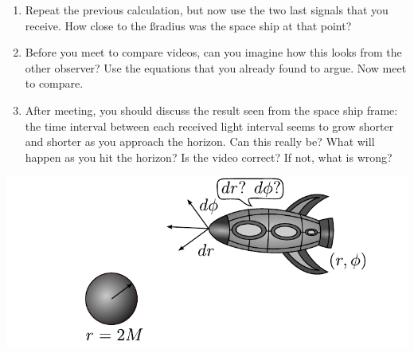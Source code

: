 {\begin{multicols}{2}
\begin{enumerate}
\item Repeat the previous calculation, but now use the two last signals that you receive. How close to the \ss radius was the space ship at that point?
\item Before you meet to compare videos, can you imagine how this looks from the other observer? Use the equations that you already found to argue. Now meet to compare.
\item After meeting, you should discuss the result seen from the space ship frame: the time interval between each received light interval seems to grow shorter and shorter as you approach the horizon. Can this really be? What will happen as you hit the horizon? Is the video correct? If not, what is wrong?
\end{enumerate}






\begin{Figure}
\centering
\includegraphics[width=\textwidth]{fig_17-1.pdf}
\end{Figure}


\end{multicols}}
